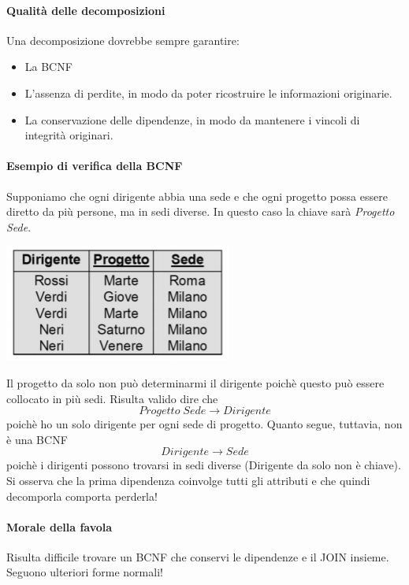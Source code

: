 \paragraph{Qualità delle decomposizioni} Una decomposizione dovrebbe sempre garantire:
\begin{itemize}
	\item La BCNF
	\item L'assenza di perdite, in modo da poter ricostruire le informazioni originarie.
	\item La conservazione delle dipendenze, in modo da mantenere i vincoli di integrità originari.
\end{itemize}
\paragraph{Esempio di verifica della BCNF} Supponiamo che ogni dirigente abbia una sede e che ogni progetto possa essere diretto da più persone, ma in sedi diverse. In questo caso la chiave sarà \emph{Progetto Sede}.
\begin{center}
	\includegraphics{images/151.PNG}
\end{center}
Il progetto da solo non può determinarmi il dirigente poichè questo può essere collocato in più sedi. Risulta valido dire che
\[Progetto\;Sede \to Dirigente\]
poichè ho un solo dirigente per ogni sede di progetto. Quanto segue, tuttavia, non è una BCNF
\[Dirigente \to Sede\]
poichè i dirigenti possono trovarsi in sedi diverse (Dirigente da solo non è chiave). Si osserva che la prima dipendenza coinvolge tutti gli attributi e che quindi decomporla comporta perderla!
\paragraph{Morale della favola} Risulta difficile trovare un BCNF che conservi le dipendenze e il JOIN insieme. Seguono ulteriori forme normali!

